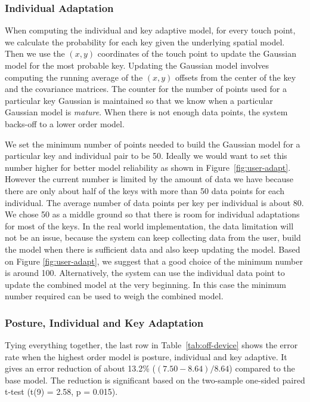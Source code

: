 \documentclass{sigchi}
\begin{document}
\subsubsection{Individual Adaptation}
When computing the individual and key adaptive model, for every touch point,
we calculate the probability for each key given the underlying spatial model.
Then we use the $(x, y)$ coordinates of the touch point to update the Gaussian model for the most probable key. Updating the Gaussian model involves computing the running average of the $(x, y)$ offsets from the center of the key and the covariance matrices. The counter for the number of points used for a particular key Gaussian is maintained so that we
know when a particular Gaussian model is \textit{mature}. When there is not enough data points, the system backs-off to a lower order model.

We set the minimum number of points needed to build the
Gaussian model for a particular key and individual pair to be 50.
Ideally we would want to set this number higher for better model reliability as 
shown in Figure~\ref{fig:user-adapt}. However the current number is limited by 
the amount of data we have because there are only about half of the keys
with more than 50 data points for each individual. The average number of data 
points per key per individual is about 80. We chose 50 as a middle ground so
that there is room for individual adaptations for most of the keys. In the real world 
implementation, the data limitation will not be an issue, because the system 
can keep collecting data from the user, build the model when there is 
sufficient data and also keep updating the model. Based on Figure
\ref{fig:user-adapt}, we suggest that a good choice of the minimum number is
around 100. Alternatively, the system can use the individual data point to 
update the combined model at the very beginning. In this case the minimum 
number required can be used to weigh the combined model.

\subsubsection{Posture, Individual and Key Adaptation}
Tying everything together, the last row in Table~\ref{tab:off-device} shows the 
error rate when the highest order model is posture, individual and key adaptive.
It gives an error reduction of about 13.2\% ($(7.50 - 8.64) / 8.64$) compared
to the base model. The reduction is significant based on
the two-sample one-sided paired t-test (t(9) = 2.58, p = 0.015).
\end{document}
